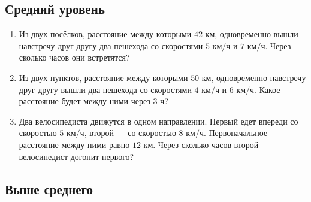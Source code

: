 \documentclass[a4paper,12pt]{article}
\newcommand{\km}{\text{ км}}
\newcommand{\kmh}{\text{ км/ч}}
\newcommand{\hour}{\text{ ч}}
\begin{document}
\subsection*{\textcolor{accent}{Средний уровень}}

\begin{enumerate}[label=\textbf{\arabic*.}]

\item
Из двух посёлков, расстояние между которыми \(42\km\), одновременно
вышли навстречу друг другу два пешехода со скоростями
\(5\kmh\) и \(7\kmh\).
Через сколько часов они встретятся?

\item
Из двух пунктов, расстояние между которыми \(50\km\), одновременно
навстречу друг другу вышли два пешехода со скоростями
\(4\kmh\) и \(6\kmh\).
Какое расстояние будет между ними через \(3\hour\)?

\item
Два велосипедиста движутся в одном направлении.
Первый едет впереди со скоростью \(5\kmh\), второй ---
со скоростью \(8\kmh\).
Первоначальное расстояние между ними равно \(12\km\).
Через сколько часов второй велосипедист догонит первого?

\end{enumerate}

\subsection*{\textcolor{accent}{Выше среднего}}
\end{document}
